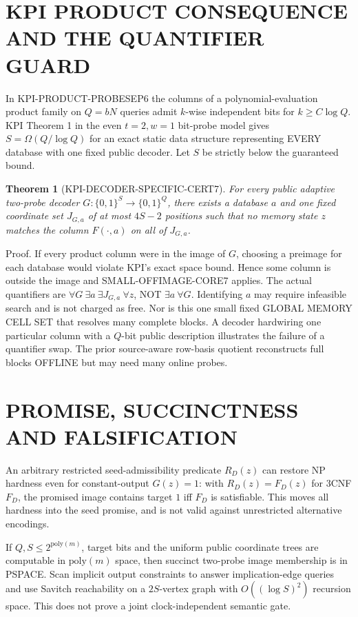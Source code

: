 \documentclass[11pt]{article}
\newtheorem{theorem}{Theorem}
\begin{document}
\section{KPI PRODUCT CONSEQUENCE AND THE QUANTIFIER GUARD}
In KPI-PRODUCT-PROBESEP6 the columns of a polynomial-evaluation product family on \(Q=bN\) queries admit \(k\)-wise independent bits for \(k\ge C\log Q\). KPI Theorem 1 in the even \(t=2,w=1\) bit-probe model gives \(S=\Omega(Q/\log Q)\) for an exact static data structure representing EVERY database with one fixed public decoder. Let \(S\) be strictly below the guaranteed bound.
\begin{theorem}[KPI-DECODER-SPECIFIC-CERT7]
For every public adaptive two-probe decoder \(G:\{0,1\}^S\to\{0,1\}^Q\), there exists a database \(a\) and one fixed coordinate set \(J_{G,a}\) of at most \(4S-2\) positions such that no memory state \(z\) matches the column \(F(\cdot,a)\) on all of \(J_{G,a}\).
\end{theorem}
\noindent Proof. If every product column were in the image of \(G\), choosing a preimage for each database would violate KPI's exact space bound. Hence some column is outside the image and SMALL-OFFIMAGE-CORE7 applies.
The actual quantifiers are \(\forall G\ \exists a\ \exists J_{G,a}\ \forall z\), NOT \(\exists a\ \forall G\). Identifying \(a\) may require infeasible search and is not charged as free. Nor is this one small fixed GLOBAL MEMORY CELL SET that resolves many complete blocks. A decoder hardwiring one particular column with a \(Q\)-bit public description illustrates the failure of a quantifier swap. The prior source-aware row-basis quotient reconstructs full blocks OFFLINE but may need many online probes.
\section{PROMISE, SUCCINCTNESS AND FALSIFICATION}
An arbitrary restricted seed-admissibility predicate \(R_D(z)\) can restore NP hardness even for constant-output \(G(z)=1\): with \(R_D(z)=F_D(z)\) for 3CNF \(F_D\), the promised image contains target \(1\) iff \(F_D\) is satisfiable. This moves all hardness into the seed promise, and is not valid against unrestricted alternative encodings.

If \(Q,S\le2^{\mathrm{poly}(m)}\), target bits and the uniform public coordinate trees are computable in \(\mathrm{poly}(m)\) space, then succinct two-probe image membership is in PSPACE. Scan implicit output constraints to answer implication-edge queries and use Savitch reachability on a \(2S\)-vertex graph with \(O((\log S)^2)\) recursion space. This does not prove a joint clock-independent semantic gate.
\end{document}
